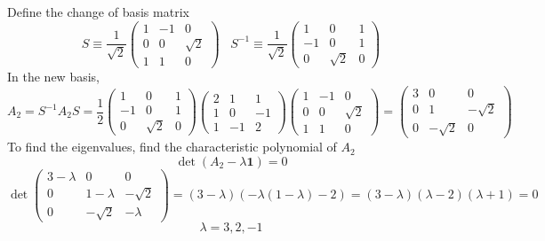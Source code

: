 \begin{sol}
Define the change of basis matrix
\begin{equation}
	S\equiv\frac{1}{\sqrt 2}\begin{pmatrix}
1&-1&0\\
0&0&\sqrt{2}\\
1&1&0
\end{pmatrix}\,\,\,\,\,S^{-1}\equiv\frac{1}{\sqrt 2}\begin{pmatrix}
1&0&1\\
-1&0&1\\
0&\sqrt{2}&0
\end{pmatrix}
\end{equation} 
In the new basis, 
\begin{equation}
	A_2=S^{-1}A_2S=\frac{1}{2}\begin{pmatrix}
1&0&1\\
-1&0&1\\
0&\sqrt{2}&0
\end{pmatrix}\begin{pmatrix}
2&1&1\\1&0&-1\\1&-1&2
\end{pmatrix}\begin{pmatrix}
1&-1&0\\
0&0&\sqrt{2}\\
1&1&0
\end{pmatrix}=\begin{pmatrix}
3&0&0\\
0&1&-\sqrt{2}\\
0&-\sqrt{2}&0
\end{pmatrix}
\end{equation} 
To find the eigenvalues, find the characteristic polynomial of $A_2$
\begin{equation}
	\det(A_2-\lambda\mathbf{1})=0
\end{equation} 
\begin{equation}
	\det\begin{pmatrix}
3-\lambda&0&0\\
0&1-\lambda&-\sqrt{2}\\
0&-\sqrt{2}&-\lambda
\end{pmatrix}=(3-\lambda)(-\lambda(1-\lambda)-2)=(3-\lambda)(\lambda-2)(\lambda+1)=0
\end{equation} 
\begin{equation}
	\lambda={3,2,-1}
\end{equation} 
\end{sol}
